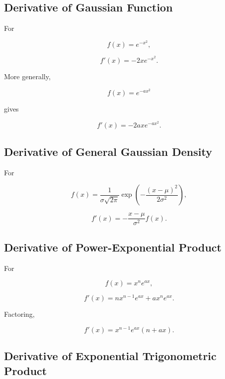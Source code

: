 \subsection{Derivative of Gaussian Function}
\label{subsec:gaussian-function-derivative}

For

\[
f(x)
=
e^{-x^2},
\]

\[
\boxed{
f'(x)
=
-2xe^{-x^2}.
}
\]

More generally,

\[
f(x)
=
e^{-ax^2}
\]

gives

\[
\boxed{
f'(x)
=
-2ax e^{-ax^2}.
}
\]

\subsection{Derivative of General Gaussian Density}
\label{subsec:normal-density-derivative}

For

\[
f(x)
=
\frac{
1
}{
\sigma\sqrt{2\pi}
}
\exp
\left(
-\frac{
(x-\mu)^2
}{
2\sigma^2
}
\right),
\]

\[
\boxed{
f'(x)
=
-\frac{
x-\mu
}{
\sigma^2
}
f(x).
}
\]

\subsection{Derivative of Power-Exponential Product}
\label{subsec:power-exponential-product-derivative}

For

\[
f(x)
=
x^ne^{ax},
\]

\[
\boxed{
f'(x)
=
nx^{n-1}e^{ax}
+
ax^ne^{ax}.
}
\]

Factoring,

\[
\boxed{
f'(x)
=
x^{n-1}e^{ax}
(n+ax).
}
\]

\subsection{Derivative of Exponential Trigonometric Product}
\label{subsec:exp-trig-product-derivative}

